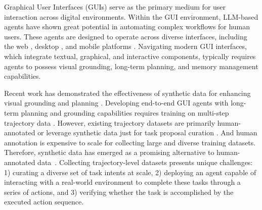 Graphical User Interfaces (GUIs) serve as the primary medium for user interaction across digital environments.
Within the GUI environment, LLM-based agents \cite{language-agent-tutorial} have shown great potential in automating complex workflows for human users.
These agents are designed to operate across diverse interfaces, including the web \cite{mind2web, DBLP:conf/iclr/ZhouX0ZLSCOBF0N24, zheng2024gpt}, desktop \cite{xie2024osworld, wu2024oscopilot, bonatti2024windows}, and mobile platforms \cite{rawles2023androidinthewild, yan2023gpt}.
Navigating modern GUI interfaces, which integrate textual, graphical, and interactive components, typically requires agents to possess visual grounding, long-term planning, and memory management capabilities.


Recent work \cite{seeclick, gou2024uground} has demonstrated the effectiveness of synthetic data for enhancing visual grounding \cite{gou2024uground, chen2024guicourse, DBLP:conf/eccv/KapoorBRKKAS24, chen2024edge} and planning \cite{xu2024aguvis, zhang-etal-2024-android}.
Developing end-to-end GUI agents with long-term planning and grounding capabilities requires training on multi-step trajectory data \cite{xu2024agenttrek, xu2024aguvis, qin2025ui}.
However, existing trajectory datasets are primarily human-annotated \cite{mind2web, li2024on, DBLP:conf/icml/LuKR24} or leverage synthetic data just for task proposal curation \cite{DBLP:conf/kdd/LaiLIYCSYZZD024, chen2024guicourse}.
And human annotation is expensive to scale for collecting large and diverse training datasets.
Therefore, synthetic data has emerged as a promising alternative to human-annotated data~\cite{hartvigsen2022toxigen, sahu2022data, ye2022zerogen, tang2023does, mukherjee2023orca, mitra2024agentinstruct}.
Collecting trajectory-level datasets presents unique challenges:
1) curating a diverse set of task intents at scale,
2) deploying an agent capable of interacting with a real-world environment to complete these tasks through a series of actions, and
3) verifying whether the task is accomplished by the executed action sequence.




